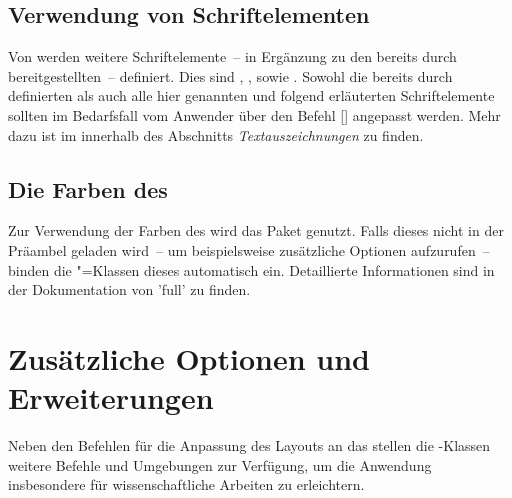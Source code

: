 \begin{Declaration*}{}
\begin{Declaration*}{}
\begin{Declaration*}{}
\subsection{Verwendung von Schriftelementen}
%
%
%
Von \TUDScript werden weitere Schriftelemente~-- in Ergänzung zu den bereits
durch \KOMAScript{} bereitgestellten~-- definiert. Dies sind , 
,  sowie . Sowohl die bereits 
durch \KOMAScript{} definierten als auch alle hier genannten und folgend 
erläuterten Schriftelemente sollten im Bedarfsfall vom Anwender über den Befehl 
[]
angepasst werden. Mehr dazu ist im \scrguide innerhalb des Abschnitts 
\emph{Textauszeichnungen} zu finden.


\subsection{Die Farben des \CDs}
%
%
Zur Verwendung der Farben des \CDs wird das Paket  
genutzt. Falls dieses nicht in der Präambel geladen wird~-- um beispielsweise 
zusätzliche Optionen aufzurufen~-- binden die \TUDScript"=Klassen dieses 
automatisch ein. Detaillierte Informationen sind in der Dokumentation von 
'full' zu finden.
%


\section{Zusätzliche Optionen und Erweiterungen}
%
Neben den Befehlen für die Anpassung des Layouts an das \TUDCD stellen die 
\TUDScript-Klassen weitere Befehle und Umgebungen zur Verfügung, um die 
Anwendung insbesondere für wissenschaftliche Arbeiten zu erleichtern.



\end{Declaration*}
\end{Declaration*}
\end{Declaration*}
